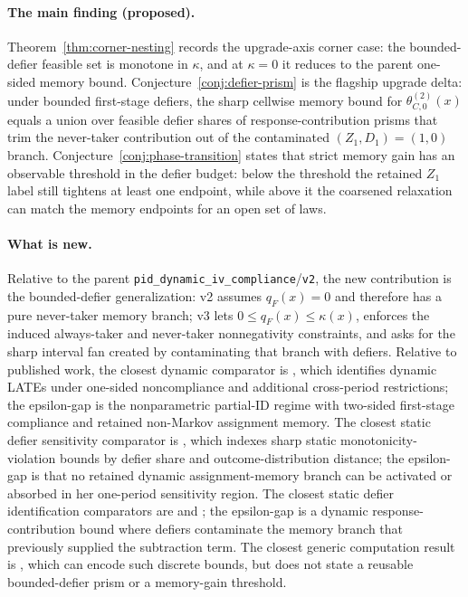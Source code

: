 \documentclass[11pt]{article}
\theoremstyle{definition}
\theoremstyle{plain}
\theoremstyle{remark}
\begin{document}
\paragraph{The main finding (proposed).}
Theorem~\ref{thm:corner-nesting} records the upgrade-axis corner case: the bounded-defier feasible set is monotone in \(\kappa\), and at \(\kappa=0\) it reduces to the parent one-sided memory bound.  Conjecture~\ref{conj:defier-prism} is the flagship upgrade delta: under bounded first-stage defiers, the sharp cellwise memory bound for \(\theta_{C,0}^{(2)}(x)\) equals a union over feasible defier shares of response-contribution prisms that trim the never-taker contribution out of the contaminated \((Z_1,D_1)=(1,0)\) branch.  Conjecture~\ref{conj:phase-transition} states that strict memory gain has an observable threshold in the defier budget: below the threshold the retained \(Z_1\) label still tightens at least one endpoint, while above it the coarsened relaxation can match the memory endpoints for an open set of laws.

\paragraph{What is new.}
Relative to the parent \texttt{pid\_dynamic\_iv\_compliance}/\texttt{v2}, the new contribution is the bounded-defier generalization: v2 assumes \(q_F(x)=0\) and therefore has a pure never-taker memory branch; v3 lets \(0\le q_F(x)\le\kappa(x)\), enforces the induced always-taker and never-taker nonnegativity constraints, and asks for the sharp interval fan created by contaminating that branch with defiers.  Relative to published work, the closest dynamic comparator is \citet{SojitraSyrgkanis2024}, which identifies dynamic LATEs under one-sided noncompliance and additional cross-period restrictions; the epsilon-gap is the nonparametric partial-ID regime with two-sided first-stage compliance and retained non-Markov assignment memory.  The closest static defier sensitivity comparator is \citet{Noack2021}, which indexes sharp static monotonicity-violation bounds by defier share and outcome-distribution distance; the epsilon-gap is that no retained dynamic assignment-memory branch can be activated or absorbed in her one-period sensitivity region.  The closest static defier identification comparators are \citet{DeChaisemartin2017} and \citet{DahlHuberMellace2023}; the epsilon-gap is a dynamic response-contribution bound where defiers contaminate the memory branch that previously supplied the subtraction term.  The closest generic computation result is \citet{DuarteFinkelsteinKnoxMummoloShpitser2024}, which can encode such discrete bounds, but does not state a reusable bounded-defier prism or a memory-gain threshold.
\end{document}
